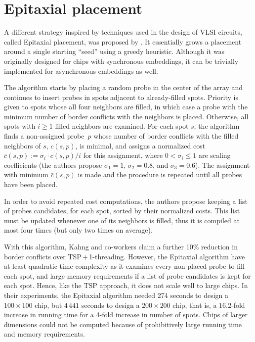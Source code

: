\section{Epitaxial placement}
\label{sec:placement_epitaxial}

A different strategy inspired by techniques used in the design of VLSI circuits,
called Epitaxial placement, was proposed by \citet{Kahng2002}. It essentially
grows a placement around a single starting ``seed'' using a greedy heuristic.
Although it was originally designed for chips with synchronous embeddings, it
can be trivially implemented for asynchronous embeddings as well.

The algorithm starts by placing a random probe in the center of the array and
continues to insert probes in spots adjacent to already-filled spots. Priority
is given to spots whose all four neighbors are filled, in which case a probe
with the minimum number of border conflicts with the neighbors is placed.
Otherwise, all spots with $i \geq 1$ filled neighbors are examined. For each
spot $s$, the algorithm finds a non-assigned probe~$p$ whose number of border
conflicts with the filled neighbors of $s$, $c(s,p)$, is minimal, and assigns a
normalized cost $\bar{c}(s,p) := \sigma_i \cdot c(s,p) / i$ for this assignment,
where $0 < \sigma_i \leq 1$ are scaling coefficients (the authors propose
$\sigma_1 = 1$, $\sigma_2 = 0.8$, and $\sigma_3 = 0.6$). The assignment with
minimum $\bar{c}(s,p)$ is made and the procedure is repeated until all probes
have been placed.

In order to avoid repeated cost computations, the authors propose keeping a list
of probes candidates, for each spot, sorted by their normalized costs. This list
must be updated whenever one of its neighbors is filled, thus it is compiled at
most four times (but only two times on average).

With this algorithm, Kahng and co-workers claim a further 10\% reduction in
border conflicts over TSP\,+\,1-threading. However, the Epitaxial algorithm have
at least quadratic time complexity as it examines every non-placed probe to fill
each spot, and large memory requirements if a list of probe candidates is kept
for each spot. Hence, like the TSP approach, it does not scale well to large
chips. In their experiments, the Epitaxial algorithm needed 274 seconds to
design a $100\times 100$ chip, but $4\,441$ seconds to design a $200\times 200$
chip, that is, a $16.2$-fold increase in running time for a 4-fold increase in
number of spots. Chips of larger dimensions could not be computed because of
prohibitively large running time and memory requirements.


